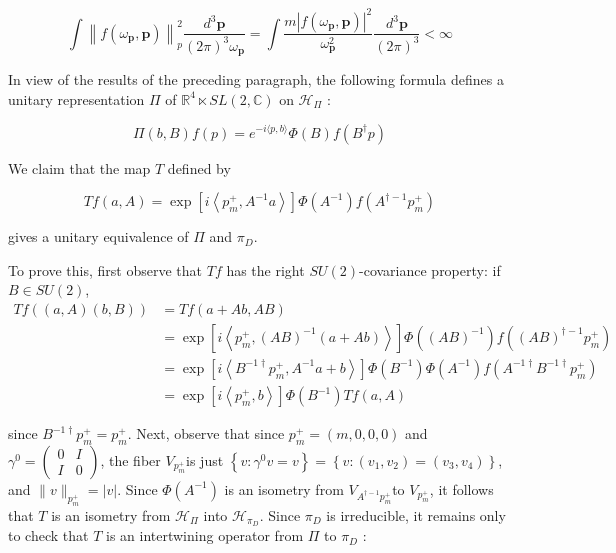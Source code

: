 \documentclass[10pt, letterpaper]{article}
\begin{document}
$$
\int\left\|f\left(\omega_{\mathbf{p}}, \mathbf{p}\right)\right\|_{p}^{2} \frac{d^{3} \mathbf{p}}{(2 \pi)^{3} \omega_{\mathbf{p}}}=\int \frac{m\left|f\left(\omega_{\mathbf{p}}, \mathbf{p}\right)\right|^{2}}{\omega_{\mathbf{p}}^{2}} \frac{d^{3} \mathbf{p}}{(2 \pi)^{3}}<\infty
$$

In view of the results of the preceding paragraph, the following formula defines a unitary representation $\Pi$ of $\mathbb{R}^{4} \ltimes S L(2, \mathbb{C})$ on $\mathcal{H}_{\Pi}$ :

$$
\Pi(b, B) f(p)=e^{-i\langle p, b\rangle} \Phi(B) f\left(B^{\dagger} p\right)
$$

We claim that the map $T$ defined by

$$
T f(a, A)=\exp \left[i\left\langle p_{m}^{+}, A^{-1} a\right\rangle\right] \Phi\left(A^{-1}\right) f\left(A^{\dagger-1} p_{m}^{+}\right)
$$

gives a unitary equivalence of $\Pi$ and $\pi_{D}$.





To prove this, first observe that $T f$ has the right $S U(2)$-covariance property: if $B \in S U(2)$,
$$
\begin{aligned}
T f((a, A)(b, B)) & =T f(a+A b, A B) \\
& =\exp \left[i\left\langle p_{m}^{+},(A B)^{-1}(a+A b)\right\rangle\right] \Phi\left((A B)^{-1}\right) f\left((A B)^{\dagger-1} p_{m}^{+}\right) \\
& =\exp \left[i\left\langle B^{-1 \dagger} p_{m}^{+}, A^{-1} a+b\right\rangle\right] \Phi\left(B^{-1}\right) \Phi\left(A^{-1}\right) f\left(A^{-1 \dagger} B^{-1 \dagger} p_{m}^{+}\right) \\
& =\exp \left[i\left\langle p_{m}^{+}, b\right\rangle\right] \Phi\left(B^{-1}\right) T f(a, A)
\end{aligned}
$$

since $B^{-1 \dagger} p_{m}^{+}=p_{m}^{+}$. Next, observe that since $p_{m}^{+}=(m, 0,0,0)$ and $\gamma^{0}=\left(\begin{array}{ll}0 & I \\ I & 0\end{array}\right)$, the fiber $V_{p_{m}^{+}}$is just $\left\{v: \gamma^{0} v=v\right\}=\left\{v:\left(v_{1}, v_{2}\right)=\left(v_{3}, v_{4}\right)\right\}$, and $\|v\|_{p_{m}^{+}}=|v|$. Since $\Phi\left(A^{-1}\right)$ is an isometry from $V_{A^{\dagger-1} p_{m}^{+}}$to $V_{p_{m}^{+}}$, it follows that $T$ is an isometry from $\mathcal{H}_{\Pi}$ into $\mathcal{H}_{\pi_{D}}$. Since $\pi_{D}$ is irreducible, it remains only to check that $T$ is an intertwining operator from $\Pi$ to $\pi_{D}$ :
\end{document}
